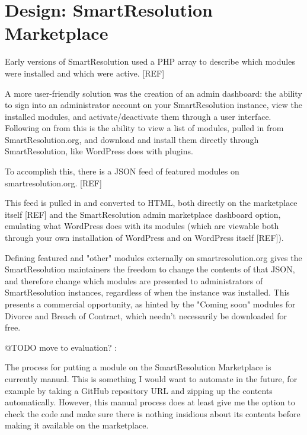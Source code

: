\section{Design: SmartResolution Marketplace}

Early versions of SmartResolution used a PHP array to describe which modules were installed and which were active. [REF] %

A more user-friendly solution was the creation of an admin dashboard: the ability to sign into an administrator account on your SmartResolution instance, view the installed modules, and activate/deactivate them through a user interface. Following on from this is the ability to view a list of modules, pulled in from SmartResolution.org, and download and install them directly through SmartResolution, like WordPress does with plugins.

To accomplish this, there is a JSON feed of featured modules on smartresolution.org. [REF] %

This feed is pulled in and converted to HTML, both directly on the marketplace itself [REF] and the SmartResolution admin marketplace dashboard option, emulating what WordPress does with its modules (which are viewable both through your own installation of WordPress and on WordPress itself [REF]). %

Defining featured and "other" modules externally on smartresolution.org gives the SmartResolution maintainers the freedom to change the contents of that JSON, and therefore change which modules are presented to administrators of SmartResolution instances, regardless of when the instance was installed. This presents a commercial opportunity, as hinted by the "Coming soon" modules for Divorce and Breach of Contract, which needn't necessarily be downloaded for free.

@TODO move to evaluation? :

The process for putting a module on the SmartResolution Marketplace is currently manual. This is something I would want to automate in the future, for example by taking a GitHub repository URL and zipping up the contents automatically. However, this manual process does at least give me the option to check the code and make sure there is nothing insidious about its contents before making it available on the marketplace.

